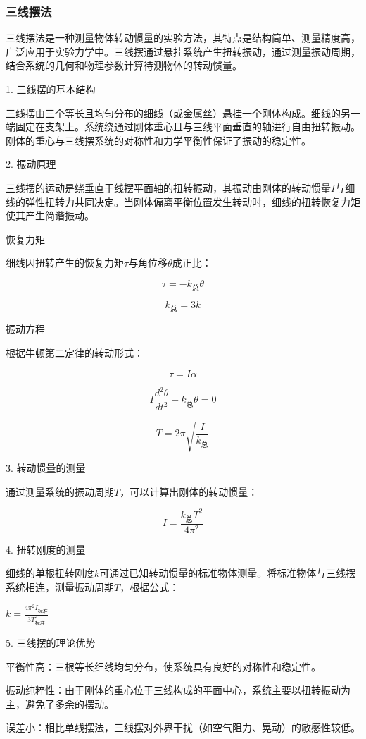 \documentclass[12pt,hyperref,a4paper,UTF8]{ctexart}
\begin{document}
\subsubsection{三线摆法}

三线摆法是一种测量物体转动惯量的实验方法，其特点是结构简单、测量精度高，广泛应用于实验力学中。三线摆通过悬挂系统产生扭转振动，通过测量振动周期，结合系统的几何和物理参数计算待测物体的转动惯量。

1. 三线摆的基本结构

三线摆由三个等长且均匀分布的细线（或金属丝）悬挂一个刚体构成。细线的另一端固定在支架上。系统绕通过刚体重心且与三线平面垂直的轴进行自由扭转振动。刚体的重心与三线摆系统的对称性和力学平衡性保证了振动的稳定性。

2. 振动原理

三线摆的运动是绕垂直于线摆平面轴的扭转振动，其振动由刚体的转动惯量$I$与细线的弹性扭转力共同决定。当刚体偏离平衡位置发生转动时，细线的扭转恢复力矩使其产生简谐振动。

恢复力矩

细线因扭转产生的恢复力矩$\tau$与角位移$\theta$成正比：

$$ \tau = -k_{\text{总}} \theta $$

$$ k_{\text{总}} = 3k $$

振动方程

根据牛顿第二定律的转动形式：

$$ \tau = I \alpha $$

$$ I \frac{d^2\theta}{dt^2} + k_{\text{总}} \theta = 0 $$

$$ T = 2\pi \sqrt{\frac{I}{k_{\text{总}}}} $$

3. 转动惯量的测量

通过测量系统的振动周期$T$，可以计算出刚体的转动惯量：

$$ I = \frac{k_{\text{总}} T^2}{4\pi^2} $$

4. 扭转刚度的测量

细线的单根扭转刚度$k$可通过已知转动惯量的标准物体测量。将标准物体与三线摆系统相连，测量振动周期$T$，根据公式：

$ k = \frac{4\pi^2 I_{\text{标准}}}{3T_{\text{标准}}^2} $

5. 三线摆的理论优势

平衡性高：三根等长细线均匀分布，使系统具有良好的对称性和稳定性。

振动纯粹性：由于刚体的重心位于三线构成的平面中心，系统主要以扭转振动为主，避免了多余的摆动。

误差小：相比单线摆法，三线摆对外界干扰（如空气阻力、晃动）的敏感性较低。
\end{document}
